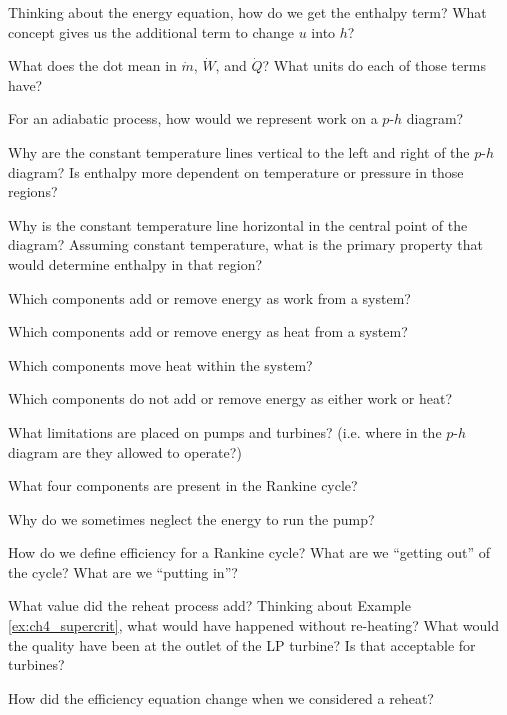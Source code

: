 \begin{homework}
  \question Thinking about the energy equation, how do we get the enthalpy term?  What concept gives us the additional term to change $u$ into $h$?
  
  \question What does the dot mean in $\dot{m}$, $\dot{W}$, and $\dot{Q}$?  What units do each of those terms have?
  
  \question For an adiabatic process, how would we represent work on a $p$-$h$ diagram?
  
  \question Why are the constant temperature lines vertical to the left and right of the $p$-$h$ diagram?  Is enthalpy more dependent on temperature or pressure in those regions?
  
  \question Why is the constant temperature line horizontal in the central point of the diagram?  Assuming constant temperature, what is the primary property that would determine enthalpy in that region?
  
  \question Which components add or remove energy as work from a system?
  
  \question Which components add or remove energy as heat from a system?
  
  \question Which components move heat within the system?
  
  \question Which components do not add or remove energy as either work or heat?

  \question What limitations are placed on pumps and turbines? (i.e. where in the $p$-$h$ diagram are they allowed to operate?)
  
  \question What four components are present in the Rankine cycle?
  
  \question Why do we sometimes neglect the energy to run the pump?
  
  \question How do we define efficiency for a Rankine cycle?  What are we ``getting out'' of the cycle?  What are we ``putting in''?
  
  \question What value did the reheat process add?  Thinking about Example \ref{ex:ch4_supercrit}, what would have happened without re-heating?  What would the quality have been at the outlet of the LP turbine?  Is that acceptable for turbines?
  
  \question How did the efficiency equation change when we considered a reheat?
  

\end{homework}
